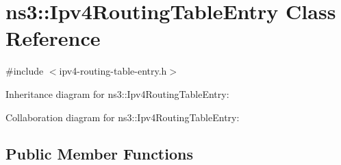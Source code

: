 \hypertarget{classns3_1_1Ipv4RoutingTableEntry}{}\section{ns3\+:\+:Ipv4\+Routing\+Table\+Entry Class Reference}
\label{classns3_1_1Ipv4RoutingTableEntry}


{\ttfamily \#include $<$ipv4-\/routing-\/table-\/entry.\+h$>$}



Inheritance diagram for ns3\+:\+:Ipv4\+Routing\+Table\+Entry\+:


Collaboration diagram for ns3\+:\+:Ipv4\+Routing\+Table\+Entry\+:
\subsection*{Public Member Functions}
